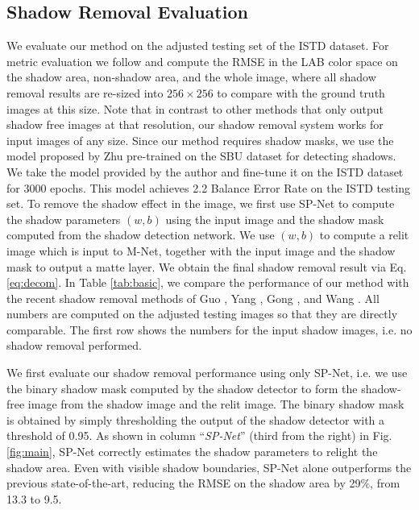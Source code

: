 \subsection{Shadow Removal Evaluation}
 
We evaluate our method on the adjusted testing set of the ISTD dataset. For metric evaluation we follow \cite{Wang_2018_CVPR} and compute the RMSE in the LAB color space on the shadow area, non-shadow area, and the whole image, where all shadow removal results are re-sized into $256\times256$ to compare with the ground truth images at this size.  Note that in contrast to other methods that only output shadow free images at that resolution, our shadow removal system works for input images of any size. Since our method requires shadow masks, we use the model proposed by Zhu \etal \cite{zhu18b} pre-trained on the SBU dataset \cite{Vicente-etal-ECCV16} for detecting shadows. We take the model provided by the author and fine-tune it on the ISTD dataset for 3000 epochs. This model achieves 2.2 Balance Error Rate on the ISTD testing set. To remove the shadow effect in the image, we first use SP-Net to compute the shadow parameters $(w,b)$ using the input image and the shadow mask computed from the shadow detection network. We use $(w,b)$ to compute a relit image which is input to M-Net, together with the input image and the shadow mask to output a matte layer. We obtain the final shadow removal result via Eq. \ref{eq:decom}. In Table \ref{tab:basic}, we compare the performance of our method with the recent shadow removal methods of Guo \etal \cite{guoPami}, Yang \etal \cite{Yang12}, Gong \etal \cite{Gong16}, and Wang \etal \cite{Wang_2018_CVPR}. All numbers are computed on the adjusted testing images so that they are directly comparable. The first row shows the numbers for the input shadow images, i.e. no shadow removal performed.



We first evaluate our shadow removal performance using only SP-Net, i.e.  we use the binary shadow mask computed by the shadow detector to form the shadow-free image from the shadow image and the relit image. 
The binary shadow mask is obtained by simply thresholding the output of the shadow detector with a threshold of 0.95. As shown in  column ``\textit{SP-Net}'' (third from the right) in Fig. \ref{fig:main}, SP-Net correctly estimates the shadow parameters to relight the shadow area. Even with visible shadow boundaries, SP-Net alone outperforms the previous state-of-the-art, reducing the RMSE on the shadow area by 29\%, from 13.3 to 9.5. 



